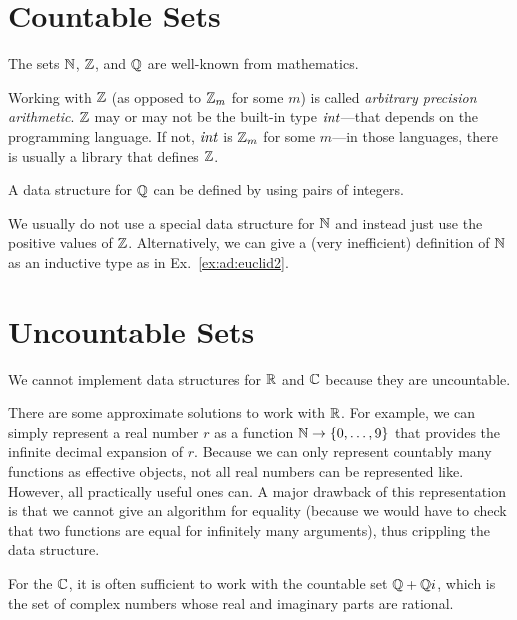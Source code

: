 \section{Countable Sets}

The sets $\mathbb{N}$, $\mathbb{Z}$, and $\mathbb{Q}$ are well-known from mathematics.

Working with $\mathbb{Z}$ (as opposed to $\mathbb{Z}_m$ for some $m$) is called \emph{arbitrary precision arithmetic}.
$\mathbb{Z}$ may or may not be the built-in type $\mathit{int}$---that depends on the programming language.
If not, $\mathit{int}$ is $\mathbb{Z}_m$ for some $m$---in those languages, there is usually a library that defines $\mathbb{Z}$.

A data structure for $\mathbb{Q}$ can be defined by using pairs of integers.

We usually do not use a special data structure for $\mathbb{N}$ and instead just use the positive values of $\mathbb{Z}$.
Alternatively, we can give a (very inefficient) definition of $\mathbb{N}$ as an inductive type as in Ex.~\ref{ex:ad:euclid2}.

\section{Uncountable Sets}

We cannot implement data structures for $\mathbb{R}$ and $\mathbb{C}$ because they are uncountable.

There are some approximate solutions to work with $\mathbb{R}$.
For example, we can simply represent a real number $r$ as a function $\mathbb{N}\to\{0,\ldots,9\}$ that provides the infinite decimal expansion of $r$.
Because we can only represent countably many functions as effective objects, not all real numbers can be represented like.
However, all practically useful ones can.
A major drawback of this representation is that we cannot give an algorithm for equality (because we would have to check that two functions are equal for infinitely many arguments), thus crippling the data structure.

For the $\mathbb{C}$, it is often sufficient to work with the countable set $\mathbb{Q}+\mathbb{Q} i$, which is the set of complex numbers whose real and imaginary parts are rational.

